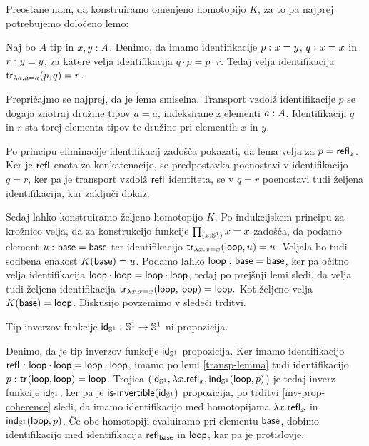 Preostane nam, da konstruiramo omenjeno homotopijo \(K\), za to pa najprej potrebujemo določeno lemo:

\begin{lema}
  \label{transp-lemma}
  Naj bo \(A\) tip in \(x, y : A\). Denimo, da imamo identifikacije \(p \,\colon x = y\), \(q \,\colon x = x\) in \(r \,\colon y = y\), za katere velja identifikacija  \(q \cdot p = p \cdot r\). Tedaj velja identifikacija \(\textnormal{\textsf{tr}}_{\lambda a. a = a}(p, q) = r\).
\end{lema}

\begin{dokaz}
  Prepričajmo se najprej, da je lema smiselna. Transport vzdolž identifikacije \(p\) se dogaja znotraj družine tipov \(a = a\), indeksirane z elementi \(a : A\). Identifikaciji \(q\) in \(r\) sta torej elementa tipov te družine pri elementih \(x\) in \(y\).

  Po principu eliminacije identifikacij zadošča pokazati, da lema velja za \(p \doteq \textnormal{\textsf{refl}}_{x}\). Ker je \(\textnormal{\textsf{refl}}_{}\) enota za konkatenacijo, se predpostavka poenostavi v identifikacijo \(q = r\), ker pa je transport vzdolž \(\textnormal{\textsf{refl}}_{}\) identiteta, se v \(q = r\) poenostavi tudi željena identifikacija, kar zaključi dokaz.
\end{dokaz}

Sedaj lahko konstruiramo željeno homotopijo \(K\). Po indukcijskem principu za krožnico velja, da za konstrukcijo funkcije \(\textstyle \prod_{\left( x : \mathbb{S}^{1} \right)} x = x\) zadošča, da podamo element \(u \,\colon \textnormal{\textsf{base}} = \textnormal{\textsf{base}}\) ter identifikacijo \(\textnormal{\textsf{tr}}_{\lambda x. x = x}(\textnormal{\textsf{loop}}, u) = u\). Veljala bo tudi sodbena enakost \(K(\textnormal{\textsf{base}}) \doteq u\).
Podamo lahko \(\textnormal{\textsf{loop}} \,\colon \textnormal{\textsf{base}} = \textnormal{\textsf{base}}\), ker pa očitno velja identifikacija \(\textnormal{\textsf{loop}} \cdot \textnormal{\textsf{loop}} = \textnormal{\textsf{loop}} \cdot \textnormal{\textsf{loop}}\), tedaj po prejšnji lemi sledi, da velja tudi željena identifikacija \(\textnormal{\textsf{tr}}_{\lambda x. x = x}(\textnormal{\textsf{loop}}, \textnormal{\textsf{loop}}) = \textnormal{\textsf{loop}}.\)
Kot željeno velja \(K(\textnormal{\textsf{base}}) = \textnormal{\textsf{loop}}\). Diskusijo povzemimo v sledeči trditvi.

\begin{trditev}
  \label{inv-circle-neg-prop}
  Tip inverzov funkcije \(\textnormal{\textsf{id}}_{\mathbb{S}^{1}} \,\colon \mathbb{S}^{1} \to \mathbb{S}^{1}\) ni propozicija.
\end{trditev}

\begin{dokaz}
  Denimo, da je tip inverzov funkcije \(\textnormal{\textsf{id}}_{\mathbb{S}^{1}}\) propozicija. Ker imamo identifikacijo \(\textnormal{\textsf{refl}}_{} \,\colon \textnormal{\textsf{loop}} \cdot \textnormal{\textsf{loop}} = \textnormal{\textsf{loop}} \cdot \textnormal{\textsf{loop}}\), imamo po lemi \ref{transp-lemma} tudi identifikacijo \(p \,\colon \textnormal{\textsf{tr}}_{}(\textnormal{\textsf{loop}}, \textnormal{\textsf{loop}}) = \textnormal{\textsf{loop}}\). Trojica
  \((\textnormal{\textsf{id}}_{\mathbb{S}^{1}}, \lambda x. \textnormal{\textsf{refl}}_{x}, \textnormal{\textsf{ind}}_{\mathbb{S}^{1}}(\textnormal{\textsf{loop}}, p)\)) je tedaj inverz funkcije \(\textnormal{\textsf{id}}_{\mathbb{S}^{1}}\), ker pa je \(\textnormal{\textsf{is-invertible}}(\textnormal{\textsf{id}}_{\mathbb{S}^{1}})\) propozicija, po trditvi \ref{inv-prop-coherence} sledi, da imamo identifikacijo med homotopijama
  \(\lambda x.\textnormal{\textsf{refl}}_{x}\) in \(\textnormal{\textsf{ind}}_{\mathbb{S}^{1}}(\textnormal{\textsf{loop}}, p)\). Če obe homotopiji evaluiramo pri elementu \(\textnormal{\textsf{base}}\), dobimo identifikacijo med identifikacija \(\textnormal{\textsf{refl}}_{\textnormal{\textsf{base}}}\) in \(\textnormal{\textsf{loop}}\), kar pa je protislovje.
\end{dokaz}

